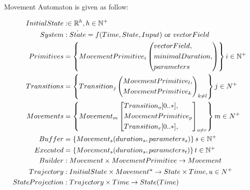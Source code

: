     \begin{definition}\label{def:movementAutomaton}Movement Automaton is given as follow:
    
    \begin{align}   
        \label{eq:madInitialState}
        InitialState&: \in \mathbb{R}^h, h\in \mathbb{N}^+\\
        \label{eq:madSystemdefinition}
        System&: \dot{State}=f(Time,State,Input)\text{ or } vectorField\\
        \label{eq:madMovementPrimitive}
        Primitives &= \left\{MovementPrimitive_i\left(
                                \begin{aligned}
                                &vectorField,\\
                                &minimalDuration,\\
                                &parameters
                                \end{aligned}\right)
                            \right\} i \in \mathbb{N}^+\\
        \label{eq:madTransitions}
        Transitions&= \left\{Transition_j\left(
                                \begin{aligned}
                                    &MovementPrimitive_l,\\
                                    &MovementPrimitive_k
                                \end{aligned}\right)_{k\neq l}\right\} j\in N^+\\
        \label{eq:madMovements}
        Movements&= \left\{Movement_m\left[
                                \begin{aligned}
                                    &Transition_o[0..*],\\
                                    &MovementPrimitive_p\\
                                    &Transition_r[0..*],\\
                                \end{aligned}\right]_{o \neq r}\right\}  m\in N^+\\
        \label{eq:madBuffer}
        Buffer&= \left\{Movement_s(duration_s,parameters_s)\right\} s\in \mathbb{N}^+\\
        \label{eq:madExecuted}
        Executed&= \left\{Movement_s(duration_s,parameters_t)\right\} t\in \mathbb{N}^+\\
        \label{eq:madBuilder}
        Builder&:Movement \times MovementPrimitive \to Movement\\
        \label{eq:madTrajectory}
        Trajectory&:InitialState\times Movement^u \to State \times Time, u\in N^+\\
        \label{eq:madStateProjection}
        StateProjection&:Trajectory\times Time \to State(Time)  
    \end{align}
    

\end{definition}
